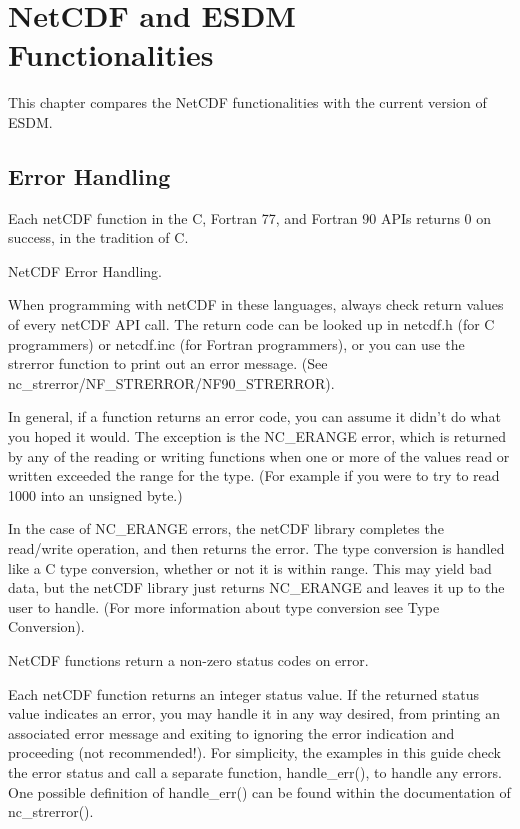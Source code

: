 \chapter{NetCDF and ESDM Functionalities}

\tab
This chapter compares the NetCDF functionalities with the current version of ESDM.

\section{Error Handling}

\tab

\begin{framed}
Each netCDF function in the C, Fortran 77, and Fortran 90 APIs returns 0 on success, in the tradition of C.

NetCDF Error Handling.

When programming with netCDF in these languages, always check return values of every netCDF API call. The return code can be looked up in netcdf.h (for C programmers) or netcdf.inc (for Fortran programmers), or you can use the strerror function to print out an error message. (See nc\_strerror/NF\_STRERROR/NF90\_STRERROR).

In general, if a function returns an error code, you can assume it didn't do what you hoped it would. The exception is the NC\_ERANGE error, which is returned by any of the reading or writing functions when one or more of the values read or written exceeded the range for the type. (For example if you were to try to read 1000 into an unsigned byte.)

In the case of NC\_ERANGE errors, the netCDF library completes the read/write operation, and then returns the error. The type conversion is handled like a C type conversion, whether or not it is within range. This may yield bad data, but the netCDF library just returns NC\_ERANGE and leaves it up to the user to handle. (For more information about type conversion see Type Conversion).

NetCDF functions return a non-zero status codes on error.

Each netCDF function returns an integer status value. If the returned status value indicates an error, you may handle it in any way desired, from printing an associated error message and exiting to ignoring the error indication and proceeding (not recommended!). For simplicity, the examples in this guide check the error status and call a separate function, handle\_err(), to handle any errors. One possible definition of handle\_err() can be found within the documentation of nc\_strerror().


\end{framed}
